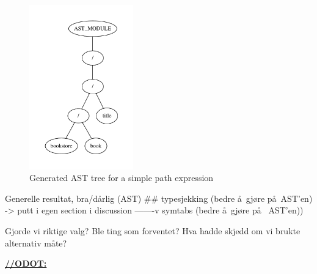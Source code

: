 \begin{figure}[h!]
\centering
 \includegraphics[width=0.4\textwidth]{img/graphs/path1}
\caption{Generated AST tree for a simple path expression}
\label{fig:discussion:ast:path1}
\end{figure}


Generelle resultat, bra/d\aa rlig (AST) \#\# typesjekking (bedre \aa~gj\o re
p\aa~AST'en) -> putt i egen section i discussion -------v 
symtabs (bedre \aa~gj\o re p\aa~ AST'en))

Gjorde vi riktige valg? Ble ting som forventet? Hva hadde skjedd om vi brukte alternativ m\aa te? 

\underline{\textbf{\LARGE //ODOT:}}